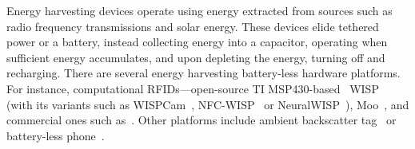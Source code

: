 Energy harvesting devices operate using energy extracted from sources such as radio frequency transmissions and solar energy. These devices elide tethered power or a battery, instead collecting energy into a capacitor, operating when sufficient energy accumulates, and upon depleting the energy, turning off and recharging.
%
%
%
There are several energy harvesting battery-less hardware platforms. For instance, computational RFIDs---open-source TI MSP430-based~\cite{wolverine} WISP~\cite{wisp5} (with its variants such as WISPCam~\cite{naderiparizi_rfid_2015}, NFC-WISP~\cite{zhao_rfid_2015} or NeuralWISP~\cite{holleman_biocas_2008}), Moo~\cite{moo}, and commercial ones such as~\cite{medusa_farsens_2017}. Other platforms include ambient backscatter tag~\cite{liu_sigcomm_2013,parks_sigcomm_2014} or battery-less phone~\cite{talla_imwut_2017}. 


